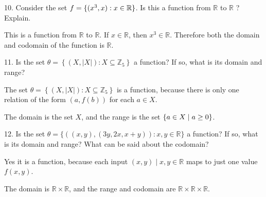 \documentclass{idrisMemo}
\begin{document}
\begin{prooflist}{10. Consider the set $f=\{(x^3, x): x \in
    \mathbb{R}\}$. Is this a function from $\mathbb{R}$ to $\mathbb{R}$ ?
Explain.}
\item This is a function from $\mathbb{R}$ to $\mathbb{R}$. If $x\in \mathbb{R}$, then
    $x^3 \in \mathbb{R}$. Therefore both the domain and codomain of the function
    is $\mathbb{R}$.
\end{prooflist}

\begin{prooflist}{11. Is the set $\theta=\left\{(X,|X|): X \subseteq
    \mathbb{Z}_5\right\}$ a function? If so, what is its domain and range?}
\item
    The set $\theta=\left\{(X,|X|): X \subseteq \mathbb{Z}_5\right\}$ is a
    function, because there is only one relation of the form $(a, f(b))$ for
    each $a\in X$.
\item The domain is the set $X$, and the range is the set $\{a\in X\mid a\geq
    0\}$.

\end{prooflist}

\begin{prooflist}{12. Is the set $\theta=\{((x, y),(3 y, 2 x, x+y)): x, y \in
    \mathbb{R}\}$ a function? If so, what is its domain and range? What can be
said about the codomain?}
\item Yes it is a function, because each input $(x, y)\mid x, y\in\mathbb{R}$
    maps to just one value $f(x, y)$.
\item The domain is $\mathbb{R}\times\mathbb{R}$, and the range and codomain are
    $\mathbb{R}\times\mathbb{R}\times\mathbb{R}$.
\end{prooflist}
\end{document}
